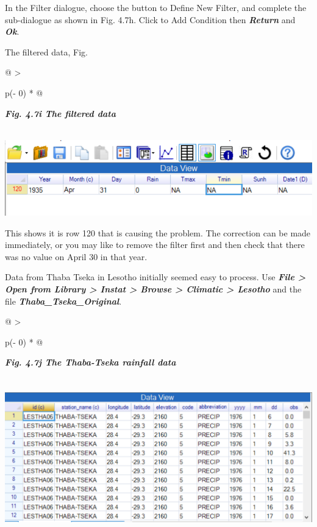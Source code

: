 \documentclass[
  letterpaper,
  DIV=11,
  numbers=noendperiod]{scrreprt}
\begin{document}
In the Filter dialogue, choose the button to Define New Filter, and
complete the sub-dialogue as shown in Fig. 4.7h. Click to Add Condition
then \textbf{\emph{Return}} and \textbf{\emph{Ok}}.

The filtered data, Fig.

\begin{longtable}[]{@{}
  >{\raggedright\arraybackslash}p{(\columnwidth - 0\tabcolsep) * }@{}}
\toprule\noalign{}
\begin{minipage}[b]{\linewidth}\raggedright
\textbf{\emph{Fig. 4.7i The filtered data}}
\end{minipage} \\
\midrule\noalign{}
\endhead
\bottomrule\noalign{}
\endlastfoot
\includegraphics[width=5.6186in,height=1.29478in]{figures/Fig4.7i.png} \\
\end{longtable}

This shows it is row 120 that is causing the problem. The correction can
be made immediately, or you may like to remove the filter first and then
check that there was no value on April 30 in that year.

Data from Thaba Tseka in Lesotho initially seemed easy to process. Use
\textbf{\emph{File \textgreater{} Open from Library \textgreater{}
Instat \textgreater{} Browse \textgreater{} Climatic \textgreater{}
Lesotho}} and the file \textbf{\emph{Thaba\_Tseka\_Original}}.

\begin{longtable}[]{@{}
  >{\raggedright\arraybackslash}p{(\columnwidth - 0\tabcolsep) * }@{}}
\toprule\noalign{}
\begin{minipage}[b]{\linewidth}\raggedright
\textbf{\emph{Fig. 4.7j The Thaba-Tseka rainfall data}}
\end{minipage} \\
\midrule\noalign{}
\endhead
\bottomrule\noalign{}
\endlastfoot
\includegraphics[width=5.52843in,height=2.33853in]{figures/Fig4.7j.png} \\
\end{longtable}
\end{document}
